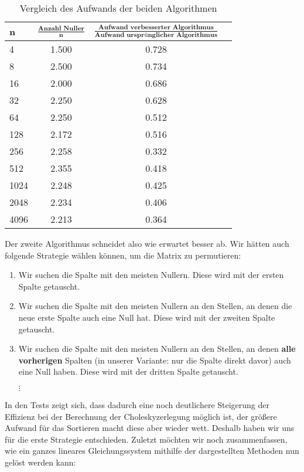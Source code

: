 \documentclass{article}
\begin{document}
\begin{table}[htb]
\centering
\caption{Vergleich des Aufwands der beiden Algorithmen}
\begin{tabular}{lccc}
\toprule
\textbf{n}	& \textbf{$\frac{\mathrm{\textbf{Anzahl Nuller}}}{\mathrm{\textbf{n}}}$}
&\textbf{$\frac{\mathrm{\textbf{Aufwand verbesserter Algorithmus}}}{\mathrm{\textbf{Aufwand ursprünglicher Algorithmus}}}$}  & \\
	        \midrule

4 & 1.500 & 0.728 \\
8 & 2.500 & 0.734 \\
16 & 2.000 & 0.686 \\
32 & 2.250 & 0.628 \\
64 & 2.250 & 0.512 \\
128 & 2.172 & 0.516 \\
256 & 2.258 & 0.332 \\
512 & 2.355 & 0.418 \\
1024 & 2.248 & 0.425 \\
2048 & 2.234 & 0.406 \\
4096 & 2.213 & 0.364 \\
\end{tabular}
\end{table}

Der zweite Algorithmus schneidet also wie erwartet besser ab. Wir hätten auch folgende Strategie wählen können, um die Matrix zu permutieren:

\begin{enumerate}
    \item Wir suchen die Spalte mit den meisten Nullern. Diese wird mit der ersten Spalte getauscht.
    \item Wir suchen die Spalte mit den meisten Nullern an den Stellen, an denen die neue erste Spalte auch eine Null hat. Diese wird mit der zweiten Spalte getauscht.
    \item Wir suchen die Spalte mit den meisten Nullern an den Stellen, an denen \textbf{alle vorherigen} Spalten (in unserer Variante: nur die Spalte direkt davor) auch eine Null haben. Diese wird mit der dritten Spalte getauscht.
    
    $\vdots$
\end{enumerate}

In den Tests zeigt sich, dass dadurch eine noch deutlichere Steigerung der Effizienz bei der Berechnung der Choleskyzerlegung möglich ist, der größere Aufwand für das Sortieren macht diese aber wieder wett. Deshalb haben wir uns für die erste Strategie entschieden.
\newline
\newline
Zuletzt möchten wir noch zusammenfassen, wie ein ganzes lineares Gleichungssystem mithilfe der dargestellten Methoden nun gelöst werden kann:
\end{document}
